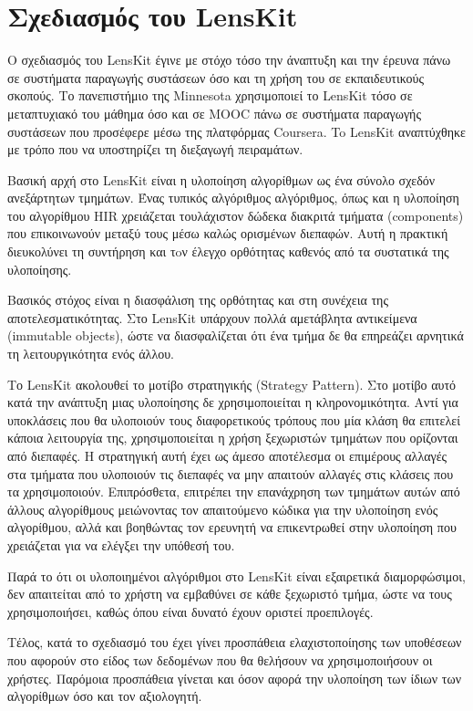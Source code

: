 \section{Σχεδιασμός του \en LensKit}
Ο σχεδιασμός του {\en LensKit} έγινε με στόχο τόσο την άναπτυξη και την έρευνα πάνω σε συστήματα παραγωγής συστάσεων όσο και τη χρήση του σε εκπαιδευτικούς σκοπούς. Το πανεπιστήμιο της {\en Minnesota} χρησιμοποιεί το {\en LensKit} τόσο σε μεταπτυχιακό του μάθημα όσο και σε {\en MOOC} πάνω σε συστήματα παραγωγής συστάσεων που προσέφερε μέσω της πλατφόρμας {\en Coursera}. To {\en LensKit} αναπτύχθηκε με τρόπο που να υποστηρίζει τη διεξαγωγή πειραμάτων.\cite{Konstan:2015:TRS:2744768.2728171} \par
Βασική αρχή στο {\en LensKit} είναι η υλοποίηση αλγορίθμων ως ένα σύνολο σχεδόν ανεξάρτητων τμημάτων. Ένας τυπικός αλγόριθμος αλγόριθμος, όπως και η υλοποίηση του αλγορίθμου {\en HIR} χρειάζεται τουλάχιστον δώδεκα διακριτά τμήματα ({\en components}) που επικοινωνούν μεταξύ τους μέσω καλώς ορισμένων διεπαφών. Αυτή η πρακτική διευκολύνει τη συντήρηση και τoν έλεγχο ορθότητας καθενός από τα συστατικά της υλοποίησης. \par
Βασικός στόχος είναι η διασφάλιση της ορθότητας και στη συνέχεια της αποτελεσματικότητας. Στο {\en LensKit} υπάρχουν πολλά αμετάβλητα αντικείμενα ({\en immutable objects}), ώστε να διασφαλίζεται ότι ένα τμήμα δε θα επηρεάζει αρνητικά τη λειτουργικότητα ενός άλλου. \par
Το {\en LensKit} ακολουθεί το μοτίβο στρατηγικής ({\en Strategy Pattern}). Στο μοτίβο αυτό κατά την ανάπτυξη μιας υλοποίησης δε χρησιμοποιείται η κληρονομικότητα. Αντί για υποκλάσεις που θα υλοποιούν τους διαφορετικούς τρόπους που μία κλάση θα επιτελεί κάποια λειτουργία της, χρησιμοποιείται η χρήση ξεχωριστών τμημάτων που ορίζονται από διεπαφές.\cite{Gamma:1995:DPE:186897} Η στρατηγική αυτή έχει ως άμεσο αποτέλεσμα οι επιμέρους αλλαγές στα τμήματα που υλοποιούν τις διεπαφές να μην απαιτούν αλλαγές στις κλάσεις που τα χρησιμοποιούν. Επιπρόσθετα, επιτρέπει την επανάχρηση των τμημάτων αυτών από άλλους αλγορίθμους μειώνοντας τον απαιτούμενο κώδικα για την υλοποίηση ενός αλγορίθμου, αλλά και βοηθώντας τον ερευνητή να επικεντρωθεί στην υλοποίηση που χρειάζεται για να ελέγξει την υπόθεσή του. \par
Παρά το ότι οι υλοποιημένοι αλγόριθμοι στο {\en LensKit} είναι εξαιρετικά διαμορφώσιμοι, δεν απαιτείται από το χρήστη να εμβαθύνει σε κάθε ξεχωριστό τμήμα, ώστε να τους χρησιμοποιήσει, καθώς όπου είναι δυνατό έχουν οριστεί προεπιλογές. 
\par Τέλος, κατά το σχεδιασμό του έχει γίνει προσπάθεια ελαχιστοποίησης των υποθέσεων που αφορούν στο είδος των δεδομένων που θα θελήσουν να χρησιμοποιήσουν οι χρήστες. Παρόμοια προσπάθεια γίνεται και όσον αφορά την υλοποίηση των ίδιων των αλγορίθμων όσο και τον αξιολογητή.
